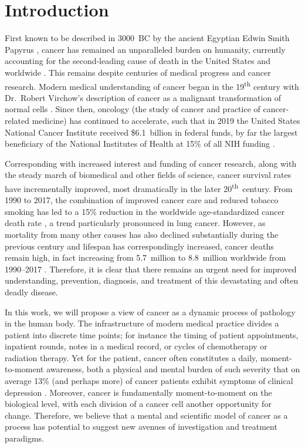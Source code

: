 \chapter{Introduction}
\label{ch:intro}

First known to be described in 3000~BC by the ancient Egyptian Edwin Smith Papyrus \cite{hajdu2011}, cancer has remained an unparalleled burden on humanity, currently accounting for the second-leading cause of death in the United States \cite{xu2020} and worldwide \cite{who_cancer_epi2018}. This remains despite centuries of medical progress and cancer research. Modern medical understanding of cancer began in the 19\textsuperscript{th} century with Dr.\ Robert Virchow's description of cancer as a malignant transformation of normal cells \cite{walter2017}. Since then, oncology (the study of cancer and practice of cancer-related medicine) has continued to accelerate, such that in 2019 the United States National Cancer Institute received \$6.1~billion in federal funds, by far the largest beneficiary of the National Institutes of Health at 15\% of all NIH funding \cite{nihbudget2000-2020}.

Corresponding with increased interest and funding of cancer research, along with the steady march of biomedical and other fields of science, cancer survival rates have incrementally improved, most dramatically in the later 20\textsuperscript{th}~century. From 1990 to 2017, the combination of improved cancer care and reduced tobacco smoking has led to a 15\% reduction in the worldwide age-standardized cancer death rate \cite{owidcancer}, a trend particularly pronounced in lung cancer. However, as mortality from many other causes has also declined substantially during the previous century and lifespan has correspondingly increased, cancer deaths remain high, in fact increasing from 5.7~million to 8.8~million worldwide from 1990--2017 \cite{owidcancer}. Therefore, it is clear that there remains an urgent need for improved understanding, prevention, diagnosis, and treatment of this devastating and often deadly disease.

In this work, we will propose a view of cancer as a dynamic process of pathology in the human body. The infrastructure of modern medical practice divides a patient into discrete time points; for instance the timing of patient appointments, inpatient rounds, notes in a medical record, or cycles of chemotherapy or radiation therapy. Yet for the patient, cancer often constitutes a daily, moment-to-moment awareness, both a physical and mental burden of such severity that on average 13\% (and perhaps more) of cancer patients exhibit symptoms of clinical depression \cite{niedzwiedz2019}. Moreover, cancer is fundamentally moment-to-moment on the biological level, with each division of a cancer cell another opportunity for change. Therefore, we believe that a mental and scientific model of cancer as a process has potential to suggest new avenues of investigation and treatment paradigms.

